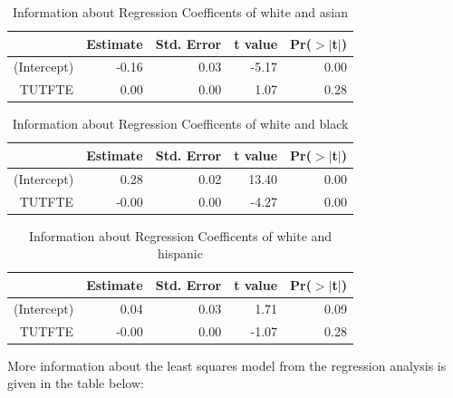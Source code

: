 \documentclass{article}
\begin{document}
\begin{table}[ht]
\centering
\caption{Information about Regression Coefficents of white and asian} 
\begin{tabular}{rrrrr}
  \hline
 & Estimate & Std. Error & t value & Pr($>$$|$t$|$) \\ 
  \hline
(Intercept) & -0.16 & 0.03 & -5.17 & 0.00 \\ 
  TUTFTE & 0.00 & 0.00 & 1.07 & 0.28 \\ 
   \hline
\end{tabular}
\end{table}
\begin{table}[ht]
\centering
\caption{Information about Regression Coefficents of white and black} 
\begin{tabular}{rrrrr}
  \hline
 & Estimate & Std. Error & t value & Pr($>$$|$t$|$) \\ 
  \hline
(Intercept) & 0.28 & 0.02 & 13.40 & 0.00 \\ 
  TUTFTE & -0.00 & 0.00 & -4.27 & 0.00 \\ 
   \hline
\end{tabular}
\end{table}
\begin{table}[ht]
\centering
\caption{Information about Regression Coefficents of white and hispanic} 
\begin{tabular}{rrrrr}
  \hline
 & Estimate & Std. Error & t value & Pr($>$$|$t$|$) \\ 
  \hline
(Intercept) & 0.04 & 0.03 & 1.71 & 0.09 \\ 
  TUTFTE & -0.00 & 0.00 & -1.07 & 0.28 \\ 
   \hline
\end{tabular}
\end{table}
More information about the least squares model from the regression analysis is given in the table below:
\end{document}
